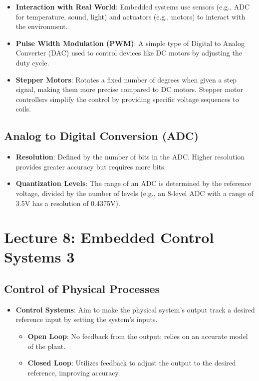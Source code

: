 \documentclass[
  14pt,
  a4paper,
  DIV=11,
  numbers=noendperiod,
  headinclude=true,
  footinclude=true]{scrreprt}
\providecommand{\tightlist}{%
  \setlength{\itemsep}{0pt}\setlength{\parskip}{0pt}}\usepackage{longtable,booktabs,array}
\begin{document}
\begin{itemize}
\tightlist
\item
  \textbf{Interaction with Real World}: Embedded systems use sensors
  (e.g., ADC for temperature, sound, light) and actuators (e.g., motors)
  to interact with the environment.
\item
  \textbf{Pulse Width Modulation (PWM)}: A simple type of Digital to
  Analog Converter (DAC) used to control devices like DC motors by
  adjusting the duty cycle.
\item
  \textbf{Stepper Motors}: Rotates a fixed number of degrees when given
  a step signal, making them more precise compared to DC motors. Stepper
  motor controllers simplify the control by providing specific voltage
  sequences to coils.
\end{itemize}

\section{Analog to Digital Conversion
(ADC)}\label{analog-to-digital-conversion-adc}

\begin{itemize}
\tightlist
\item
  \textbf{Resolution}: Defined by the number of bits in the ADC. Higher
  resolution provides greater accuracy but requires more bits.
\item
  \textbf{Quantization Levels}: The range of an ADC is determined by the
  reference voltage, divided by the number of levels (e.g., an 8-level
  ADC with a range of 3.5V has a resolution of 0.4375V).
\end{itemize}

\chapter{Lecture 8: Embedded Control Systems
3}\label{lecture-8-embedded-control-systems-3}

\section{Control of Physical
Processes}\label{control-of-physical-processes}

\begin{itemize}
\tightlist
\item
  \textbf{Control Systems}: Aim to make the physical system's output
  track a desired reference input by setting the system's inputs.

  \begin{itemize}
  \tightlist
  \item
    \textbf{Open Loop}: No feedback from the output; relies on an
    accurate model of the plant.
  \item
    \textbf{Closed Loop}: Utilizes feedback to adjust the output to the
    desired reference, improving accuracy.
  \end{itemize}
\end{itemize}
\end{document}
